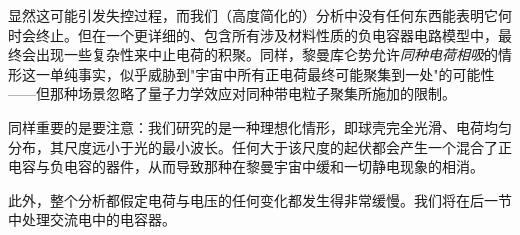 显然这可能引发失控过程，而我们（高度简化的）分析中没有任何东西能表明它何时会终止。但在一个更详细的、包含所有涉及材料性质的负电容器电路模型中，最终会出现一些复杂性来中止电荷的积聚。同样，黎曼库仑势允许\emph{同种电荷相吸}的情形这一单纯事实，似乎威胁到"宇宙中所有正电荷最终可能聚集到一处"的可能性——但那种场景忽略了量子力学效应对同种带电粒子聚集所施加的限制。

同样重要的是要注意：我们研究的是一种理想化情形，即球壳完全光滑、电荷均匀分布，其尺度远小于光的最小波长。任何大于该尺度的起伏都会产生一个混合了正电容与负电容的器件，从而导致那种在黎曼宇宙中缓和一切静电现象的相消。

此外，整个分析都假定电荷与电压的任何变化都发生得非常缓慢。我们将在后一节中处理交流电中的电容器。
